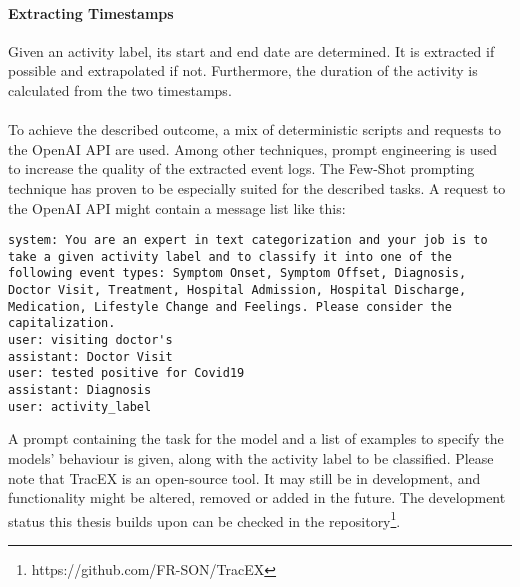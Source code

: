 \paragraph{Extracting Timestamps} Given an activity label, its start and end date are determined. It is extracted if possible and extrapolated if not. Furthermore, the duration of the activity is calculated from the two timestamps.\\\\
To achieve the described outcome, a mix of deterministic scripts and requests to the OpenAI API are used. Among other techniques, prompt engineering is used to increase the quality of the extracted event logs.
The Few-Shot prompting technique has proven to be especially suited for the described tasks. A request to the OpenAI API might contain a message list like this:
\begin{lstlisting}[language=prompt, caption={Few-shot prompt to categorize activities into event types}, label={lst:few-shot}]
system: You are an expert in text categorization and your job is to take a given activity label and to classify it into one of the following event types: Symptom Onset, Symptom Offset, Diagnosis, Doctor Visit, Treatment, Hospital Admission, Hospital Discharge, Medication, Lifestyle Change and Feelings. Please consider the capitalization.  
user: visiting doctor's 
assistant: Doctor Visit  
user: tested positive for Covid19
assistant: Diagnosis
user: activity_label  
\end{lstlisting}
A prompt containing the task for the model and a list of examples to specify the models' behaviour is given, along with the activity label to be classified.
Please note that TracEX is an open-source tool. It may still be in development, and functionality might be altered, removed or added in the future. The development status this thesis builds upon can be checked in the repository\footnote{https://github.com/FR-SON/TracEX}.
